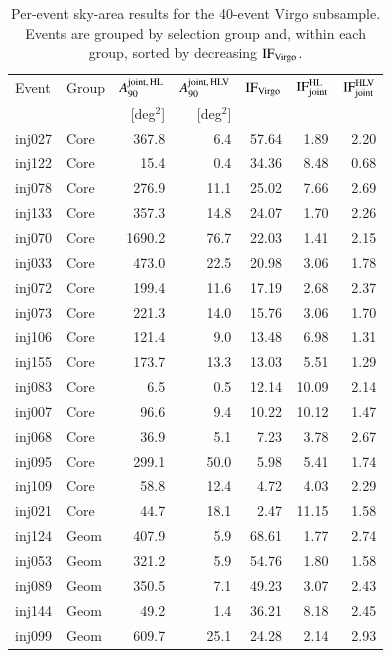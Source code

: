 \documentclass{aa}
\begin{document}
\begin{appendix}
\begin{table}[ht!]
\centering
\caption{Per-event sky-area results for the 40-event Virgo subsample.
  Events are grouped by selection group and, within each group, sorted by
  decreasing $\mathrm{IF}_{\rm Virgo}$.}
\label{tab:virgo_subsample}
\begin{tabular}{llrrrrr}
\hline\hline
Event & Group & $A_{90}^{\rm joint,\,HL}$ & $A_{90}^{\rm joint,\,HLV}$ &
$\mathrm{IF}_{\rm Virgo}$ & $\mathrm{IF}_{\rm joint}^{\rm HL}$ &
$\mathrm{IF}_{\rm joint}^{\rm HLV}$ \\
 & & [deg$^2$] & [deg$^2$] & & & \\
\hline
inj027 & Core & 367.8 & 6.4 & 57.64 & 1.89 & 2.20 \\
inj122 & Core & 15.4 & 0.4 & 34.36 & 8.48 & 0.68 \\
inj078 & Core & 276.9 & 11.1 & 25.02 & 7.66 & 2.69 \\
inj133 & Core & 357.3 & 14.8 & 24.07 & 1.70 & 2.26 \\
inj070 & Core & 1690.2 & 76.7 & 22.03 & 1.41 & 2.15 \\
inj033 & Core & 473.0 & 22.5 & 20.98 & 3.06 & 1.78 \\
inj072 & Core & 199.4 & 11.6 & 17.19 & 2.68 & 2.37 \\
inj073 & Core & 221.3 & 14.0 & 15.76 & 3.06 & 1.70 \\
inj106 & Core & 121.4 & 9.0 & 13.48 & 6.98 & 1.31 \\
inj155 & Core & 173.7 & 13.3 & 13.03 & 5.51 & 1.29 \\
inj083 & Core & 6.5 & 0.5 & 12.14 & 10.09 & 2.14 \\
inj007 & Core & 96.6 & 9.4 & 10.22 & 10.12 & 1.47 \\
inj068 & Core & 36.9 & 5.1 & 7.23 & 3.78 & 2.67 \\
inj095 & Core & 299.1 & 50.0 & 5.98 & 5.41 & 1.74 \\
inj109 & Core & 58.8 & 12.4 & 4.72 & 4.03 & 2.29 \\
inj021 & Core & 44.7 & 18.1 & 2.47 & 11.15 & 1.58 \\
\noalign{\smallskip}
inj124 & Geom & 407.9 & 5.9 & 68.61 & 1.77 & 2.74 \\
inj053 & Geom & 321.2 & 5.9 & 54.76 & 1.80 & 1.58 \\
inj089 & Geom & 350.5 & 7.1 & 49.23 & 3.07 & 2.43 \\
inj144 & Geom & 49.2 & 1.4 & 36.21 & 8.18 & 2.45 \\
inj099 & Geom & 609.7 & 25.1 & 24.28 & 2.14 & 2.93 \\

\end{tabular}
\end{table}
\end{appendix}
\end{document}
